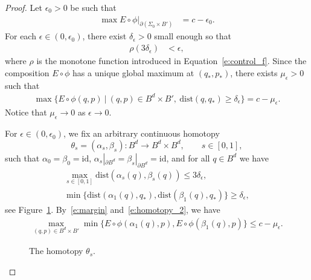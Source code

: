 \documentclass[reqno]{amsart}
\numberwithin{equation}{section}
\theoremstyle{personal}%
\theoremstyle{definition}
\newcommand{\dist}{\mathrm{dist}}
\begin{document}
\begin{proof}
Let $\epsilon_0>0$ be such that
\begin{align}
\label{e:energy_boundary}
\max E\circ\phi|_{\partial(\Sigma_0\times B')} & = c-\epsilon_0.
\end{align}
For each $\epsilon\in(0,\epsilon_0)$, there exist $\delta_\epsilon>0$ small enough so that
\begin{align}
\label{e:delta}
 \rho(3\delta_\epsilon) & <\epsilon,
\end{align}
where $\rho$ is the monotone function introduced in Equation~\eqref{e:control_f}. Since the composition $E\circ\phi$ has a unique global maximum at $(q_*,p_*)$, there exists $\mu_\epsilon>0$ such that
\begin{align}
\label{e:margin}
\max\big\{E\circ\phi(q,p)\ \big|\ 
(q,p)\in B^d\times B',\ \dist(q,q_*)\geq\delta_\epsilon
\big\}
=
c-\mu_\epsilon.
\end{align}
Notice that $\mu_\epsilon\to0$ as $\epsilon\to0$.

For $\epsilon\in(0,\epsilon_0)$, we fix an arbitrary continuous homotopy 
\[\theta_s=(\alpha_s,\beta_s):B^d\to B^d\times B^d,\qquad s\in[0,1],\]
such that $\alpha_0=\beta_0=\mathrm{id}$, $\alpha_s|_{\partial B^d}=\beta_s|_{\partial B^d}=\mathrm{id}$, and for all $q\in B^d$ we have
\begin{gather}
\label{e:homotopy_1}
 \max_{s\in[0,1]} \dist(\alpha_s(q),\beta_s(q))\leq 3\delta_\epsilon,\\
\label{e:homotopy_2}
 \min\big\{\dist(\alpha_1(q),q_*),\dist(\beta_1(q),q_*)\big\}\geq\delta_\epsilon,
\end{gather}
see Figure~\ref{f:homotopy}. By~\eqref{e:margin} and~\eqref{e:homotopy_2}, we have
\begin{align}
\label{e:estimate_below}
\max_{(q,p)\in B^d\times B'}\min\big\{E\circ\phi(\alpha_1(q),p),E\circ\phi(\beta_1(q),p)\big\}\leq c-\mu_\epsilon.
\end{align}

\begin{figure}
\begin{center}
\begin{footnotesize}
 
\end{footnotesize}
\begin{small}
\caption{The homotopy $\theta_s$.}
\label{f:homotopy}
\end{small}
\end{center}
\end{figure}


\end{proof}
\end{document}
